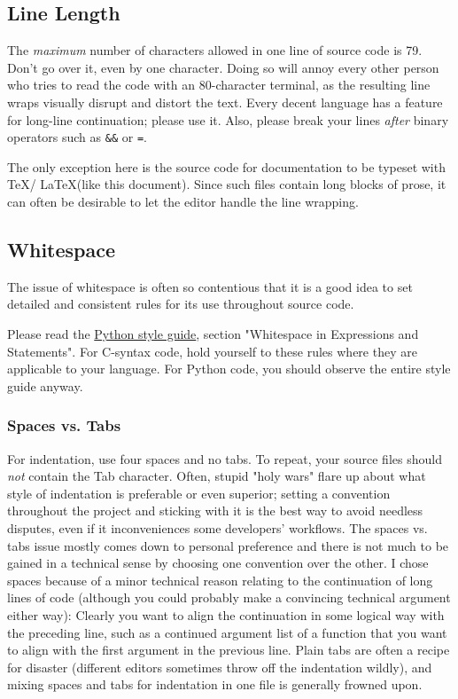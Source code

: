 \documentclass[12pt]{article}
\newcommand{\code}[1]{\texttt{#1}}
\begin{document}
\subsection{Line Length} The \emph{maximum} number of characters allowed in one line of source code is 79. Don't go over it, even by one character. Doing so will annoy every other person who tries to read the code with an 80-character terminal, as the resulting line wraps visually disrupt and distort the text. Every decent language has a feature for long-line continuation; please use it. Also, please break your lines \textit{after} binary operators such as \code{\&\&} or \code{=}.

The only exception here is the source code for documentation to be typeset with \TeX / \LaTeX (like this document). Since such files contain long blocks of prose, it can often be desirable to let the editor handle the line wrapping.

\subsection{Whitespace}
\label{sec:spacing}
The issue of whitespace is often so contentious that it is a good idea to set detailed and consistent rules for its use throughout source code.

Please read the \hyperref[pyguide]{Python style guide}, section "Whitespace in Expressions and Statements". For C-syntax code, hold yourself to these rules where they are applicable to your language. For Python code, you should observe the entire style guide anyway.

\subsubsection{Spaces vs. Tabs}
For indentation, use four spaces and no tabs. To repeat, your source files should \emph{not} contain the Tab character. Often, stupid "holy wars" flare up about what style of indentation is preferable or even superior; setting a convention throughout the project and sticking with it is the best way to avoid needless disputes, even if it inconveniences some developers' workflows. The spaces vs. tabs issue mostly comes down to personal preference and there is not much to be gained in a technical sense by choosing one convention over the other. I chose spaces because of a minor technical reason relating to the continuation of long lines of code (although you could probably make a convincing technical argument either way): Clearly you want to align the continuation in some logical way with the preceding line, such as a continued argument list of a function that you want to align with the first argument in the previous line. Plain tabs are often a recipe for disaster (different editors sometimes throw off the indentation wildly), and mixing spaces and tabs for indentation in one file is generally frowned upon.
\end{document}
